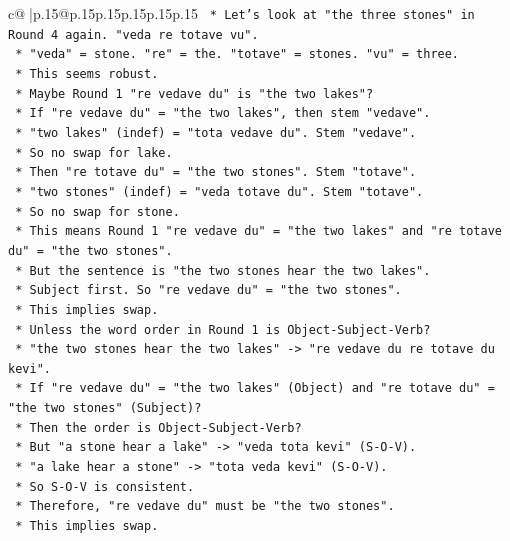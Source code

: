 \documentclass{article}
\begin{document}
{\begin{supertabular}{c@{$\;$}|p{.15\linewidth}@{}p{.15\linewidth}p{.15\linewidth}p{.15\linewidth}p{.15\linewidth}p{.15\linewidth}}
{{{\texttt{        *   Let's look at "the three stones" in Round 4 again. "veda re totave vu".} \\
\texttt{        *   "veda" = stone. "re" = the. "totave" = stones. "vu" = three.} \\
\texttt{        *   This seems robust.} \\
\texttt{        *   Maybe Round 1 "re vedave du" is "the two lakes"?} \\
\texttt{        *   If "re vedave du" = "the two lakes", then stem "vedave".} \\
\texttt{        *   "two lakes" (indef) = "tota vedave du". Stem "vedave".} \\
\texttt{        *   So no swap for lake.} \\
\texttt{        *   Then "re totave du" = "the two stones". Stem "totave".} \\
\texttt{        *   "two stones" (indef) = "veda totave du". Stem "totave".} \\
\texttt{        *   So no swap for stone.} \\
\texttt{        *   This means Round 1 "re vedave du" = "the two lakes" and "re totave du" = "the two stones".} \\
\texttt{        *   But the sentence is "the two stones hear the two lakes".} \\
\texttt{        *   Subject first. So "re vedave du" = "the two stones".} \\
\texttt{        *   This implies swap.} \\
\texttt{        *   Unless the word order in Round 1 is Object{-}Subject{-}Verb?} \\
\texttt{        *   "the two stones hear the two lakes" {-}> "re vedave du re totave du kevi".} \\
\texttt{        *   If "re vedave du" = "the two lakes" (Object) and "re totave du" = "the two stones" (Subject)?} \\
\texttt{        *   Then the order is Object{-}Subject{-}Verb?} \\
\texttt{        *   But "a stone hear a lake" {-}> "veda tota kevi" (S{-}O{-}V).} \\
\texttt{        *   "a lake hear a stone" {-}> "tota veda kevi" (S{-}O{-}V).} \\
\texttt{        *   So S{-}O{-}V is consistent.} \\
\texttt{        *   Therefore, "re vedave du" must be "the two stones".} \\
\texttt{        *   This implies swap.} \\
}}}
\end{supertabular}}
\end{document}
